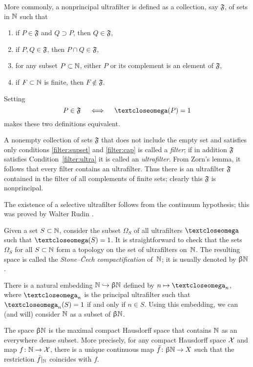 More commonly, a nonprincipal ultrafilter is defined as a collection, say $\mathfrak{F}$, of sets in $\mathbb{N}$ such that
\begin{enumerate}
\item\label{filter:supset} if $P\in \mathfrak{F}$ and $Q\supset P$, then $Q\in \mathfrak{F}$,
\item\label{filter:cap} if $P, Q\in \mathfrak{F}$, then $P\cap Q\in \mathfrak{F}$,
\item\label{filter:ultra} for any subset $P\subset\NN$, either $P$ or its complement is an element of $\mathfrak{F}$,
\item\label{filter:non-prin} if $F\subset \NN $ is finite, then $F\notin \mathfrak{F}$.
\end{enumerate}

Setting 
\[P\in\mathfrak{F}\quad\iff\quad\o(P)=1\] 
makes these two definitions equivalent.

A nonempty collection of sets $\mathfrak{F}$ that does not include the empty set and satisfies only conditions \ref{filter:supset} and \ref{filter:cap} is called a \emph{filter}; 
if in addition $\mathfrak{F}$ satisfies Condition~\ref{filter:ultra} it is called an \emph{ultrafilter}.
From Zorn's lemma, it follows that every filter contains an ultrafilter.
Thus there is an ultrafilter $\mathfrak{F}$ contained in the filter of all complements of finite sets; clearly this $\mathfrak{F}$ is nonprincipal.

The existence of a selective ultrafilter follows from the continuum hypothesis;
this was proved by Walter Rudin \cite{rudin}.

Given a set $S\subset \NN$, consider the subset $\Omega_S$ of all ultrafilters $\o$ such that $\o(S)=1$.
It is straightforward to check that the sets $\Omega_S$ for all $S\subset \NN$ form a topology on the set of ultrafilters on~$\mathbb{N}$. 
The resulting space is called the \emph{Stone--\v{C}ech compactification} of~$\mathbb{N}$; it is usually denoted by $\upbeta\mathbb{N}$.

There is a natural embedding $\NN\hookrightarrow\beta\NN$ defined by 
$n\mapsto\o_n$, where $\o_n$ is the principal ultrafilter such that $\o_n(S)=1$ if and only if $n\in S$. 
Using this embedding, we can (and will) consider $\mathbb{N}$ as a subset of $\upbeta\mathbb{N}$.

The space $\upbeta\mathbb{N}$ is the maximal compact Hausdorff space that contains $\mathbb{N}$  as an everywhere dense subset.
More precisely, for any compact Hausdorff space $\mathcal{X}$ 
and map $f\:\NN\to \spc{X}$, there is a unique continuous map $\bar f\:\beta\NN\to X$ such that the restriction $\bar f|_{\mathbb{N}}$ coincides with $f$. 

